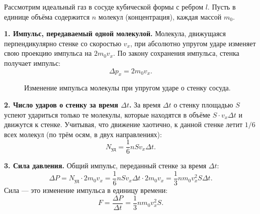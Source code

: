 \begin{theorem}
Рассмотрим идеальный газ в сосуде кубической формы с ребром $l$. Пусть в единице объёма содержится $n$ молекул (концентрация), каждая массой $m_0$.

\textbf{1. Импульс, передаваемый одной молекулой.}
Молекула, движущаяся перпендикулярно стенке со скоростью $v_x$, при абсолютно упругом ударе изменяет свою проекцию импульса на $2m_0 v_x$. По закону сохранения импульса, стенка получает импульс:
\begin{equation}
    \Delta p_x = 2 m_0 v_x.
\end{equation}

\begin{figure}[H]
\centering
{}
\caption{Изменение импульса молекулы при упругом ударе о стенку сосуда.}
\end{figure}

\textbf{2. Число ударов о стенку за время $\Delta t$.}
За время $\Delta t$ о стенку площадью $S$ успеют удариться только те молекулы, которые находятся в объёме $S \cdot v_x \Delta t$ и движутся к стенке. Учитывая, что движение хаотично, к данной стенке летит $1/6$ всех молекул (по трём осям, в двух направлениях):
\begin{equation}
    N_{\text{уд}} = \frac{1}{6} n S v_x \Delta t.
\end{equation}

\textbf{3. Сила давления.}
Общий импульс, переданный стенке за время $\Delta t$:
\begin{equation}
    \Delta P = N_{\text{уд}} \cdot 2 m_0 v_x = \frac{1}{6} n S v_x \Delta t \cdot 2 m_0 v_x = \frac{1}{3} n m_0 v_x^2 S \Delta t.
\end{equation}
Сила --- это изменение импульса в единицу времени:
\begin{equation}
    F = \frac{\Delta P}{\Delta t} = \frac{1}{3} n m_0 v_x^2 S.
\end{equation}


\end{theorem}
